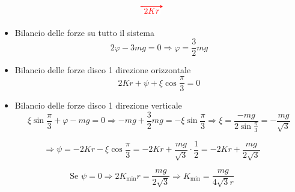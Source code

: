 \begin{example}{}
\[\begin{tikzpicture}[scale=1.2, >=stealth]
  \draw[red, thick, ->] (-0.7, 0.65) -- (0.1, 0.65) node[midway, below, fill=white, inner sep=1pt] {\(2Kr\)};

\end{tikzpicture}
\]

\begin{itemize}
  \item Bilancio delle forze su tutto il sistema
  \[
  2\varphi - 3mg = 0 \Rightarrow \varphi = \frac{3}{2}mg
  \]

  \item Bilancio delle forze disco 1 direzione orizzontale
  \[
  2Kr + \psi + \xi \cos \frac{\pi}{3} = 0
  \]

  \item Bilancio delle forze disco 1 direzione verticale
  \[
  \xi \sin \frac{\pi}{3} + \varphi - mg = 0
  \Rightarrow
  -mg + \frac{3}{2}mg = -\xi \sin \frac{\pi}{3}
  \Rightarrow
  \xi =
  \frac{-mg}{2\sin \frac{\pi}{3}}
  =
  -\frac{mg}{\sqrt{3}}
  \]
\end{itemize}

\[
\Rightarrow
\psi =
-2Kr - \xi \cos \frac{\pi}{3}
=
-2Kr + \frac{mg}{\sqrt{3}}\cdot \frac{1}{2}
=
-2Kr + \frac{mg}{2\sqrt{3}}
\]

\[
\text{Se } \psi = 0
\Rightarrow
2K_{\min}r = \frac{mg}{2\sqrt{3}}
\Rightarrow
K_{\min} = \frac{mg}{4\sqrt{3}r}
\]
\end{example}
